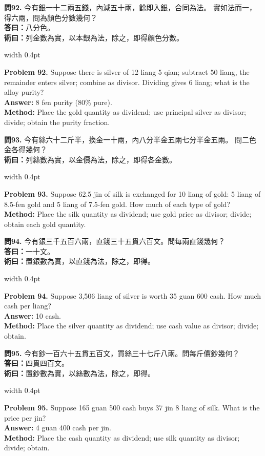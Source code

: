 \documentclass[10pt,a4paper]{article}
\newlength{\cnwidth}
\newlength{\enwidth}
\newcommand{\bilingual}[2]{%
  \noindent%
  \begin{minipage}[t]{\cnwidth}%
    #1%
  \end{minipage}%
  \hfill\vrule width 0.4pt\hfill%
  \begin{minipage}[t]{\enwidth}%
    #2%
  \end{minipage}%
  \par\smallskip%
}
\begin{document}
\bilingual{%
  \textbf{問92.}
  今有銀一十二兩五錢，內減五十兩，餘即入銀，合同為法。
  實如法而一，得六兩，問為顏色分數幾何？\\
  \textbf{答曰：}八分色。\\
  \textbf{術曰：}列金數為實，以本銀為法，除之，即得顏色分數。
}{%
  \textbf{Problem 92.}
  Suppose there is silver of 12 liang 5 qian; subtract 50 liang,
  the remainder enters silver; combine as divisor.
  Dividing gives 6 liang; what is the alloy purity?\\
  \textbf{Answer:} 8 fen purity (80\% pure).\\
  \textbf{Method:} Place the gold quantity as dividend; use principal silver as
  divisor; divide; obtain the purity fraction.
}

\bilingual{%
  \textbf{問93.}
  今有絲六十二斤半，換金一十兩，內八分半金五兩七分半金五兩。
  問二色金各得幾何？\\
  \textbf{術曰：}列絲數為實，以金價為法，除之，即得各金數。
}{%
  \textbf{Problem 93.}
  Suppose 62.5 jin of silk is exchanged for 10 liang of gold:
  5 liang of 8.5-fen gold and 5 liang of 7.5-fen gold.
  How much of each type of gold?\\
  \textbf{Method:} Place the silk quantity as dividend; use gold price as divisor;
  divide; obtain each gold quantity.
}

\bilingual{%
  \textbf{問94.}
  今有銀三千五百六兩，直錢三十五貫六百文。問每兩直錢幾何？\\
  \textbf{答曰：}一十文。\\
  \textbf{術曰：}置銀數為實，以直錢為法，除之，即得。
}{%
  \textbf{Problem 94.}
  Suppose 3,506 liang of silver is worth 35 guan 600 cash.
  How much cash per liang?\\
  \textbf{Answer:} 10 cash.\\
  \textbf{Method:} Place the silver quantity as dividend; use cash value as divisor;
  divide; obtain.
}

\bilingual{%
  \textbf{問95.}
  今有鈔一百六十五貫五百文，買絲三十七斤八兩。問每斤價鈔幾何？\\
  \textbf{答曰：}四貫四百文。\\
  \textbf{術曰：}置鈔數為實，以絲數為法，除之，即得。
}{%
  \textbf{Problem 95.}
  Suppose 165 guan 500 cash buys 37 jin 8 liang of silk.
  What is the price per jin?\\
  \textbf{Answer:} 4 guan 400 cash per jin.\\
  \textbf{Method:} Place the cash quantity as dividend; use silk quantity as divisor;
  divide; obtain.
}
\end{document}

